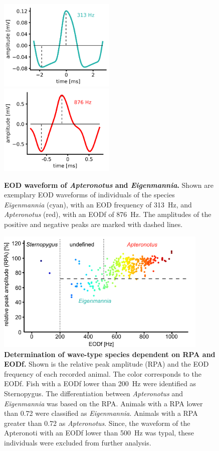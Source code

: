 \begin{figure}[H]
    \centering
    \includegraphics[width=0.496\textwidth]{pictures/Methods/waveform_eig.png}
    \includegraphics[width=0.496\textwidth]{pictures/Methods/waveform_apt.png}
    \caption{\textbf{EOD waveform of \textit{Apteronotus} and \textit{Eigenmannia}.} Shown are exemplary EOD waveforms of individuals of the species \textit{Eigenmannia} (cyan), with an EOD frequency of 313~Hz, and \textit{Apteronotus} (red), with an EODf of 876~Hz. The amplitudes of the positive and negative peaks are marked with dashed lines.}
    \label{fig:EOD_waveforms}
\end{figure}{}

\begin{figure}[H]
    \centering
    \includegraphics[width=0.9\textwidth]{pictures/Methods/cluster.png}
    \caption{\textbf{Determination of wave-type species dependent on RPA and EODf.} Shown is the relative peak amplitude (RPA) and the EOD frequency of each recorded animal. The color corresponds to the EODf. Fish with a EODf lower than 200~Hz were identified as Sternopygus. The differentiation between \textit{Apteronotus} and \textit{Eigenmannia} was based on the RPA. Animals with a RPA lower than 0.72 were classified as \textit{Eigenmannia}. Animals with a RPA greater than 0.72 as \textit{Apteronotus}. Since, the waveform of the Apteronoti with an EODf lower than 500~Hz was typal, these individuals were excluded from further analysis.}
    \label{fig:cluster}
\end{figure}{}